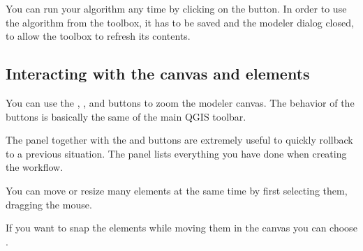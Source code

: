 \documentclass[letterpaper,10pt,english]{sphinxmanual}
\begin{document}
\sphinxAtStartPar
You can run your algorithm any time by clicking on the  button.
In order to use the algorithm from the toolbox, it has to be saved
and the modeler dialog closed, to allow the toolbox to refresh its
contents.


\subsection{Interacting with the canvas and elements}
\label{\detokenize{Introduction/models:interacting-with-the-canvas-and-elements}}
\sphinxAtStartPar
You can use the , ,  and  buttons
to zoom the modeler canvas. The behavior of the buttons is basically the same
of the main QGIS toolbar.

\sphinxAtStartPar
The  panel together with the  and  buttons are
extremely useful to quickly rollback to a previous situation. The 
panel lists everything you have done when creating the workflow.

\sphinxAtStartPar
You can move or resize many elements at the same time by first selecting them,
dragging the mouse.

\sphinxAtStartPar
If you want to snap the elements while moving them in the canvas you can choose
.
\end{document}
